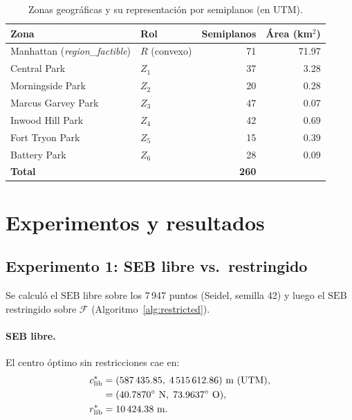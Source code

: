 \documentclass[11pt,a4paper]{article}
\theoremstyle{definition}
\theoremstyle{remark}
\newcommand{\FF}{\mathcal{F}}
\newcommand{\seb}{\mathrm{SEB}}
\begin{document}
\begin{table}[h]
\centering
\caption{Zonas geográficas y su representación por semiplanos (en UTM).}
\label{tab:zonas}
\begin{tabular}{llrr}
\toprule
\textbf{Zona} & \textbf{Rol} & \textbf{Semiplanos} & \textbf{Área (km$^2$)}\\
\midrule
Manhattan (\textit{region\_factible}) & $R$ (convexo) & 71 & 71.97 \\
Central Park & $Z_1$ & 37 & 3.28 \\
Morningside Park & $Z_2$ & 20 & 0.28 \\
Marcus Garvey Park & $Z_3$ & 47 & 0.07 \\
Inwood Hill Park & $Z_4$ & 42 & 0.69 \\
Fort Tryon Park & $Z_5$ & 15 & 0.39 \\
Battery Park & $Z_6$ & 28 & 0.09 \\
\midrule
\textbf{Total} & & \textbf{260} & \\
\bottomrule
\end{tabular}
\end{table}

\section{Experimentos y resultados}
\label{sec:results}

\subsection{Experimento 1: SEB libre vs.\ restringido}
\label{sec:exp1}

Se calculó el $\seb$ libre sobre los 7\,947 puntos (Seidel, semilla 42) y
luego el $\seb$ restringido sobre $\FF$ (Algoritmo~\ref{alg:restricted}).

\paragraph{SEB libre.}
El centro óptimo sin restricciones cae en:
\begin{align}
  c^*_\text{lib} &= (587\,435.85,\; 4\,515\,612.86)\text{ m (UTM)}, \notag\\
  &= (40.7870^\circ\text{ N},\; 73.9637^\circ\text{ O}), \notag\\
  r^*_\text{lib} &= 10\,424.38\text{ m}. \notag
\end{align}
\end{document}
